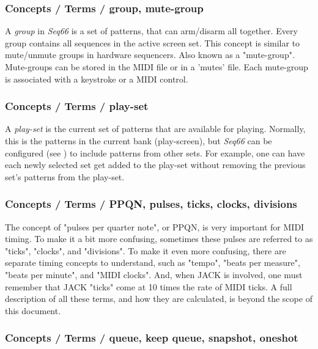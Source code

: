 \subsubsection{Concepts / Terms / group, mute-group}
\label{subsubsec:concepts_terms_group}

   A \textsl{group} in \textsl{Seq66} is a
   set of patterns, that can arm/disarm all together.
   Every group contains all sequences in the active screen set. 
   This concept is similar to mute/unmute groups in hardware
   sequencers.
   Also known as a "mute-group".
   Mute-groups can be stored in the MIDI file or in a 'mutes' file.
   Each mute-group is associated with a keystroke or a MIDI control.

\subsubsection{Concepts / Terms / play-set}
\label{subsubsec:concepts_terms_playset}

   A \textsl{play-set} is the current set of patterns that are available for
   playing.  Normally, this is the patterns in the current bank (play-screen),
   but \textsl{Seq66} can be configured
   (see )
   to include patterns from other sets.
   For example, one can have each newly selected set get added to the play-set
   without removing the previous set's patterns from the play-set.

\subsubsection{Concepts / Terms / PPQN, pulses, ticks, clocks, divisions}
\label{subsubsec:concepts_terms_pulses}

   The concept of "pulses per quarter note", or PPQN, is very important for
   MIDI timing.  To make it a bit more confusing, sometimes these pulses are
   referred to as "ticks", "clocks", and "divisions".
   To make it even more confusing, there are separate timing concepts to
   understand, such as "tempo", "beats per measure", "beats per minute", and
   "MIDI clocks".
   And, when JACK is involved, one must remember that JACK "ticks" come at 10
   times the rate of MIDI ticks.
   A full description of all these terms, and how they are calculated, is
   beyond the scope of this document.

\subsubsection{Concepts / Terms / queue, keep queue, snapshot, oneshot}
\label{subsubsec:concepts_terms_queue_mode}

